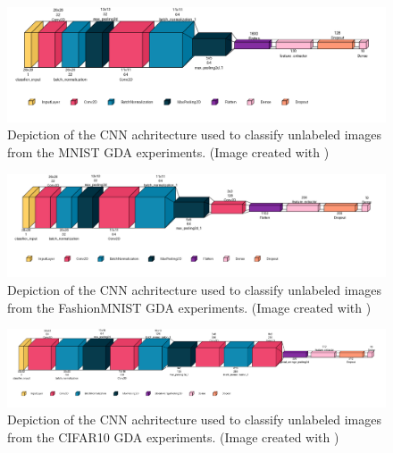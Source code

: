 \begin{figure}[htbp]
    \centering
    \vspace{-2em}
    \includegraphics[width=.9\textwidth]{abb/netron_network_archs/classifying_Classifier_MNIST.png}
    \caption{Depiction of the CNN achritecture used to classify unlabeled images from the MNIST GDA experiments. (Image created with \cite{Gavrikov2020VisualKeras})}
    \label{fig:figure_class_mnist}
\end{figure}

\begin{figure}[htbp]
    \centering
    \vspace{-2em}
    \includegraphics[width=.9\textwidth]{abb/netron_network_archs/classifying_Classifier_FashionMNIST.png}
    \caption{Depiction of the CNN achritecture used to classify unlabeled images from the FashionMNIST GDA experiments. (Image created with \cite{Gavrikov2020VisualKeras})}
    \label{fig:figure_class_fashion}
\end{figure}

\begin{figure}[htbp]
    \centering
    \vspace{-2em}
    \includegraphics[width=.9\textwidth]{abb/netron_network_archs/classifying_Classifier_Cifar10.png}
    \caption{Depiction of the CNN achritecture used to classify unlabeled images from the CIFAR10 GDA experiments. (Image created with \cite{Gavrikov2020VisualKeras})}
    \label{fig:figure_class_cifar10}
\end{figure}

